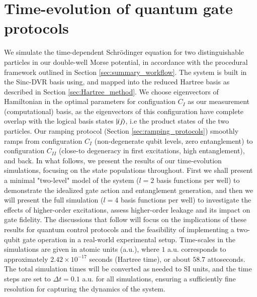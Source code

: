 \documentclass{subfiles}
\begin{document}
\section{Time-evolution of quantum gate protocols}\label{sec:time_evolution}
We simulate the time-dependent Schrödinger equation for two distinguishable particles in our double-well Morse potential, in accordance with the procedural framework outlined in Section \ref{sec:summary_workflow}. The system is built in the Sinc-DVR basis using, and mapped into the reduced Hartree basis as described in Section \ref{sec:Hartree_method}. We choose eigenvectors of Hamiltonian in the optimal parameters for configuation $C_I$ as our measurement (computational) basis, as the eigenvectors of this configuration have complete overlap with the logical basis states $\ket{ij}$, i.e the product states of the two particles. Our ramping protocol (Section \ref{sec:ramping_protocols}) smoothly ramps from configuration $C_I$ (non-degenerate qubit levels, zero entanglement) to configuration $C_{II}$ (close-to degeneracy in first excitations, high entanglement), and back. In what follows, we present the results of our time-evolution simulations, focusing on the state populations throughout. First we shall present a minimal "two-level" model of the system ($l=2$ basis functions per well) to demonstrate the idealized gate action and entanglement generation, and then we will present the full simulation ($l=4$ basis functions per well) to investigate the effects of higher-order excitations, assess higher-order leakage and its impact on gate fidelity. The discussions that follow will focus on the implications of these results for quantum control protocols and the feasibility of implementing a two-qubit gate operation in a real-world experimental setup. Time-scales in the simulations are given in atomic units (a.u.), where $1$ a.u. corresponds to approximately $2.42 \times 10^{-17}$ seconds (Hartree time), or about $58.7$ attoseconds. The total simulation times will be converted as needed to SI units, and the time steps are set to $\Delta t = 0.1$ a.u. for all simulations, ensuring a sufficiently fine resolution for capturing the dynamics of the system.
\end{document}
